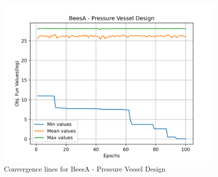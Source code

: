 \begin{figure}[H]
\centering
\caption{Convergence lines for BeesA - Pressure Vessel Design}
\label{fig:pressure_vessel_problem_solve_beesa}
\includegraphics[scale=0.5]{images/pressure_vessel_problem_solve_beesa.png}
\end{figure}
        